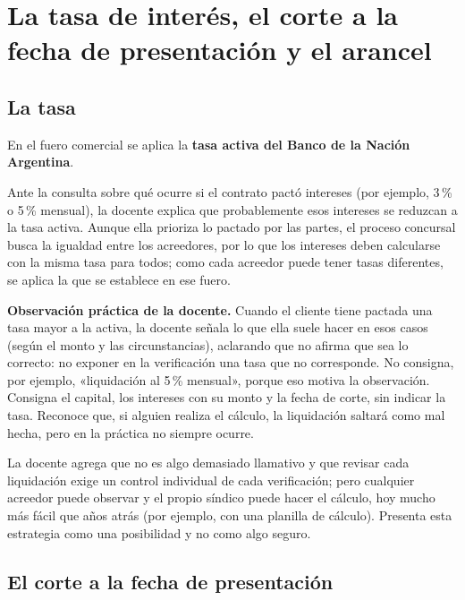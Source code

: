 \documentclass[12pt,oneside]{book}
\begin{document}
\section{La tasa de interés, el corte a la fecha de presentación y el arancel}

\subsection{La tasa}

En el fuero comercial se aplica la \textbf{tasa activa del Banco de la Nación Argentina}.

Ante la consulta sobre qué ocurre si el contrato pactó intereses (por ejemplo, 3\,\% o 5\,\% mensual), la docente explica que probablemente esos intereses se reduzcan a la tasa activa. Aunque ella prioriza lo pactado por las partes, el proceso concursal busca la igualdad entre los acreedores, por lo que los intereses deben calcularse con la misma tasa para todos; como cada acreedor puede tener tasas diferentes, se aplica la que se establece en ese fuero.

\begin{note}
\textbf{Observación práctica de la docente.} Cuando el cliente tiene pactada una tasa mayor a la activa, la docente señala lo que ella suele hacer en esos casos (según el monto y las circunstancias), aclarando que no afirma que sea lo correcto: no exponer en la verificación una tasa que no corresponde. No consigna, por ejemplo, «liquidación al 5\,\% mensual», porque eso motiva la observación. Consigna el capital, los intereses con su monto y la fecha de corte, sin indicar la tasa. Reconoce que, si alguien realiza el cálculo, la liquidación saltará como mal hecha, pero en la práctica no siempre ocurre.
\end{note}

La docente agrega que no es algo demasiado llamativo y que revisar cada liquidación exige un control individual de cada verificación; pero cualquier acreedor puede observar y el propio síndico puede hacer el cálculo, hoy mucho más fácil que años atrás (por ejemplo, con una planilla de cálculo). Presenta esta estrategia como una posibilidad y no como algo seguro.

\subsection{El corte a la fecha de presentación}
\end{document}
